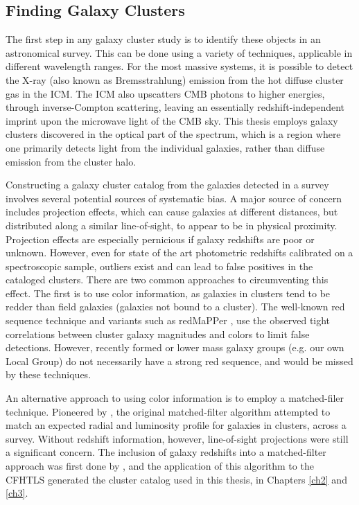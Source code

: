 \subsection{Finding Galaxy Clusters}
\label{sec:ClusterFinding}
The first step in any galaxy cluster study is to identify these objects in an astronomical survey. This can be done using a variety of techniques, applicable in different wavelength ranges. For the most massive systems, it is possible to detect the X-ray (also known as Bremsstrahlung) emission from the hot diffuse cluster gas in the \acf{ICM}. The \ac{ICM} also upscatters \ac{CMB} photons to higher energies, through inverse-Compton scattering, leaving an essentially redshift-independent imprint upon the microwave light of the \ac{CMB} sky. This thesis employs galaxy clusters discovered in the optical part of the spectrum, which is a region where one primarily detects light from the individual galaxies, rather than diffuse emission from the cluster halo. 

Constructing a galaxy cluster catalog from the galaxies detected in a survey involves several potential sources of systematic bias. A major source of concern includes projection effects, which can cause galaxies at different distances, but distributed along a similar line-of-sight, to appear to be in physical proximity. Projection effects are especially pernicious if galaxy redshifts are poor or unknown. However, even for state of the art photometric redshifts calibrated on a spectroscopic sample, outliers exist and can lead to false positives in the cataloged clusters. There are two common approaches to circumventing this effect. The first is to use color information, as galaxies in clusters tend to be redder than field galaxies (galaxies not bound to a cluster). The well-known red sequence technique \citep{Gladders00} and variants such as redMaPPer \citep{Rykoff14}, use the observed tight correlations between cluster galaxy magnitudes and colors to limit false detections. However, recently formed or lower mass galaxy groups (e.g. our own Local Group) do not necessarily have a strong red sequence, and would be missed by these techniques. 

An alternative approach to using color information is to employ a matched-filer technique. Pioneered by \citet{Postman96}, the original matched-filter algorithm attempted to match an expected radial and luminosity profile for galaxies in clusters, across a survey. Without redshift information, however, line-of-sight projections were still a significant concern. The inclusion of galaxy redshifts into a matched-filter approach was first done by \citet{Milkeraitis10}, and the application of this algorithm to the \ac{CFHTLS} generated the cluster catalog used in this thesis, in Chapters \ref{ch2} and \ref{ch3}.

